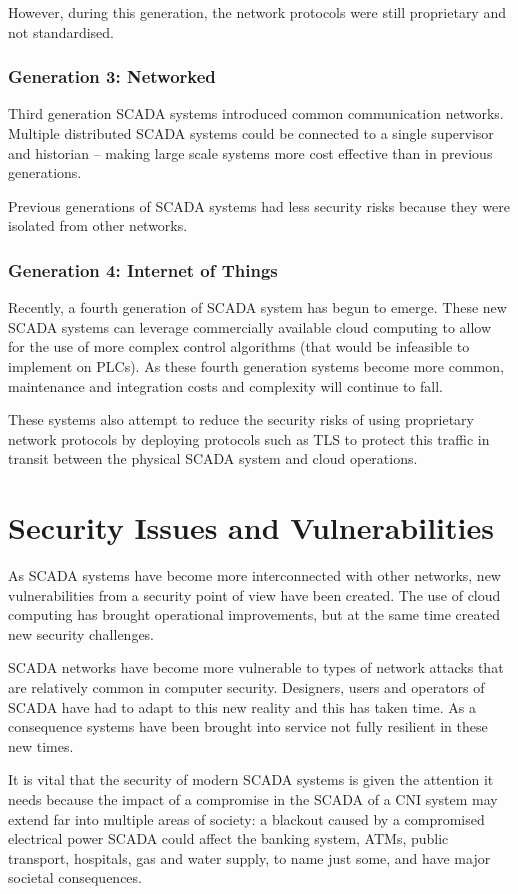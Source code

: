 However, during this generation, the network protocols were still proprietary and not standardised.
\subsubsection*{Generation 3: Networked}
Third generation SCADA systems introduced common communication networks. Multiple distributed SCADA systems could be connected to a single supervisor and historian -- making large scale systems more cost effective than in previous generations.

Previous generations of SCADA systems had less security risks because they were isolated from other networks.
\subsubsection*{Generation 4: Internet of Things}
Recently, a fourth generation of SCADA system has begun to emerge. These new SCADA systems can leverage commercially available cloud computing to allow for the use of more complex control algorithms (that would be infeasible to implement on PLCs). As these fourth generation systems become more common, maintenance and integration costs and complexity will continue to fall.

These systems also attempt to reduce the security risks of using proprietary network protocols by deploying protocols such as TLS to protect this traffic in transit between the physical SCADA system and cloud operations.

\pagebreak
\section{Security Issues and Vulnerabilities}
As SCADA systems have become more interconnected with other networks, new vulnerabilities from a security point of view have been created. The use of cloud computing has brought operational improvements, but at the same time created new security challenges.

SCADA networks have become more vulnerable to types of network attacks that are relatively common in computer security. Designers, users and operators of SCADA have had to adapt to this new reality and this has taken time. As a consequence systems have been brought into service not fully resilient in these new times.

It is vital that the security of modern SCADA systems is given the attention it needs because the impact of a compromise in the SCADA of a CNI system may extend far into multiple areas of society: a blackout caused by a compromised electrical power SCADA could affect the banking system, ATMs, public transport, hospitals, gas and water supply, to name just some, and have major societal consequences.

